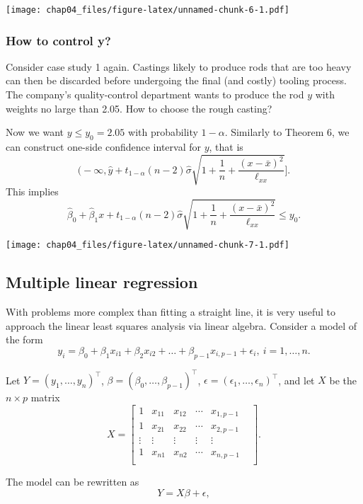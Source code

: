 \documentclass[]{article}
\begin{document}
\texttt{[image: chap04\_files/figure-latex/unnamed-chunk-6-1.pdf]}

\hypertarget{how-to-control-y}{%
\subsubsection{How to control y?}\label{how-to-control-y}}

Consider case study 1 again. Castings likely to produce rods that are
too heavy can then be discarded before undergoing the final (and costly)
tooling process. The company's quality-control department wants to
produce the rod \(y\) with weights no large than 2.05. How to choose the
rough casting?

Now we want \(y\le y_0=2.05\) with probability \(1-\alpha\). Similarly
to Theorem 6, we can construct one-side confidence interval for \(y\),
that is
\[\bigg(-\infty,\hat y+t_{1-\alpha}(n-2)\hat{\sigma}\sqrt{1+\frac{1}{n}+\frac{(x-\bar x)^2}{\ell_{xx}}}\bigg].\]
This implies
\[\hat\beta_0+\hat\beta_1x+t_{1-\alpha}(n-2)\hat{\sigma}\sqrt{1+\frac{1}{n}+\frac{(x-\bar x)^2}{\ell_{xx}}}\le y_0.\]

\texttt{[image: chap04\_files/figure-latex/unnamed-chunk-7-1.pdf]}

\hypertarget{multiple-linear-regression}{%
\subsection{Multiple linear
regression}\label{multiple-linear-regression}}

With problems more complex than fitting a straight line, it is very
useful to approach the linear least squares analysis via linear algebra.
Consider a model of the form
\[y_i=\beta_0+\beta_1x_{i1}+\beta_2x_{i2}+\dots+\beta_{p-1}x_{i,p-1}+\epsilon_i,\ i=1,\dots,n.\]

Let \(Y=(y_1,\dots,y_n)^\top\),
\(\beta=(\beta_0,\dots,\beta_{p-1})^\top\),
\(\epsilon=(\epsilon_1,\dots,\epsilon_n)^\top\), and let \(X\) be the
\(n\times p\) matrix \[
X=
\left[
\begin{matrix}
1 & x_{11} & x_{12} & \cdots & x_{1,p-1}\\
1 & x_{21} & x_{22} & \cdots & x_{2,p-1}\\
\vdots & \vdots & \vdots & \vdots & \vdots & \\
1 & x_{n1} & x_{n2} & \cdots & x_{n,p-1}\\
\end{matrix}
\right].
\]

The model can be rewritten as \[Y=X\beta+\epsilon,\]
\end{document}
